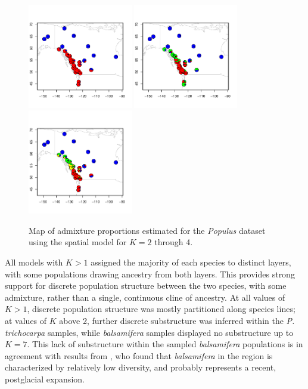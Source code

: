 \documentclass[12pt]{article}
\newcommand{\bals}{\textit{balsamifera}}
\begin{document}
\begin{figure}
	\centering
			{\includegraphics[width=1.8in,height=1.8in]{figs/populus/populus_sp2.pdf}}
			{\includegraphics[width=1.8in,height=1.8in]{figs/populus/populus_sp3.pdf}}
			{\includegraphics[width=1.8in,height=1.8in]{figs/populus/populus_sp4.pdf}}
	\caption{
	Map of admixture proportions estimated for the \textit{Populus} dataset 
	using the spatial model for $K=2$ through 4.
    }\label{populus_pies}
\end{figure}

All models with $K>1$ assigned the majority of each species
to distinct layers, with some populations drawing ancestry from both layers.
This provides strong support for discrete population structure between the two species,
with some admixture,
rather than a single, continuous cline of ancestry.
At all values of $K>1$, discrete population structure was mostly partitioned along species lines; 
at values of $K$ above 2, further discrete substructure was inferred within the \textit{P. trichocarpa} samples, 
while \bals{} samples displayed no substructure up to $K=7$.
This lack of substructure within the sampled \bals{} populations is in agreement with results from 
\citet{keller_etal_2010}, who found that \bals{} in the region is characterized by relatively low diversity, 
and probably represents a recent, postglacial expansion.
\end{document}

